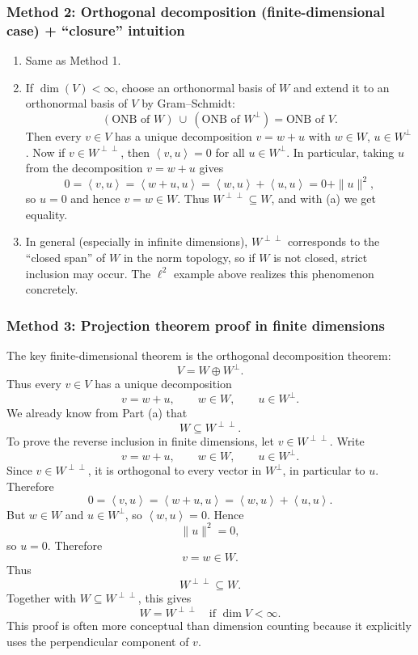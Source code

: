 \documentclass[12pt]{article}
\newcommand{\ip}[2]{\left\langle #1,#2\right\rangle}
\begin{document}
\subsubsection{Method 2: Orthogonal decomposition (finite-dimensional case) + ``closure'' intuition}
\begin{enumerate}[label=(\alph*)]
\item Same as Method 1.

\item If $\dim(V)<\infty$, choose an orthonormal basis of $W$ and extend it to an orthonormal basis of $V$ by Gram--Schmidt:
\[
(\text{ONB of }W)\ \cup\ (\text{ONB of }W^\perp)=\text{ONB of }V.
\]
Then every $v\in V$ has a unique decomposition $v=w+u$ with $w\in W$, $u\in W^\perp$.
Now if $v\in W^{\perp\perp}$, then $\ip{v}{u}=0$ for all $u\in W^\perp$.
In particular, taking $u$ from the decomposition $v=w+u$ gives
\[
0=\ip{v}{u}=\ip{w+u}{u}=\ip{w}{u}+\ip{u}{u} = 0+\|u\|^2,
\]
so $u=0$ and hence $v=w\in W$. Thus $W^{\perp\perp}\subseteq W$, and with (a) we get equality.

\item In general (especially in infinite dimensions), $W^{\perp\perp}$ corresponds to the ``closed span'' of $W$ in the norm topology,
so if $W$ is not closed, strict inclusion may occur. The $\ell^2$ example above realizes this phenomenon concretely.
\end{enumerate}



\subsubsection{Method 3: Projection theorem proof in finite dimensions}
The key finite-dimensional theorem is the orthogonal decomposition theorem:
\[
V=W\oplus W^{\perp}.
\]
Thus every $v\in V$ has a unique decomposition
\[
v=w+u,
\qquad w\in W,
\qquad u\in W^{\perp}.
\]
We already know from Part (a) that
\[
W\subseteq W^{\perp\perp}.
\]
To prove the reverse inclusion in finite dimensions, let $v\in W^{\perp\perp}$. Write
\[
v=w+u,
\qquad w\in W,
\qquad u\in W^{\perp}.
\]
Since $v\in W^{\perp\perp}$, it is orthogonal to every vector in $W^{\perp}$, in particular to $u$. Therefore
\[
0=\ip{v}{u}=\ip{w+u}{u}=\ip{w}{u}+\ip{u}{u}.
\]
But $w\in W$ and $u\in W^{\perp}$, so $\ip{w}{u}=0$. Hence
\[
\|u\|^2=0,
\]
so $u=0$. Therefore
\[
v=w\in W.
\]
Thus
\[
W^{\perp\perp}\subseteq W.
\]
Together with $W\subseteq W^{\perp\perp}$, this gives
\[
\boxed{\,W=W^{\perp\perp}\quad\text{if }\dim V<\infty.\,}
\]
This proof is often more conceptual than dimension counting because it explicitly uses the perpendicular component of $v$.
\end{document}
